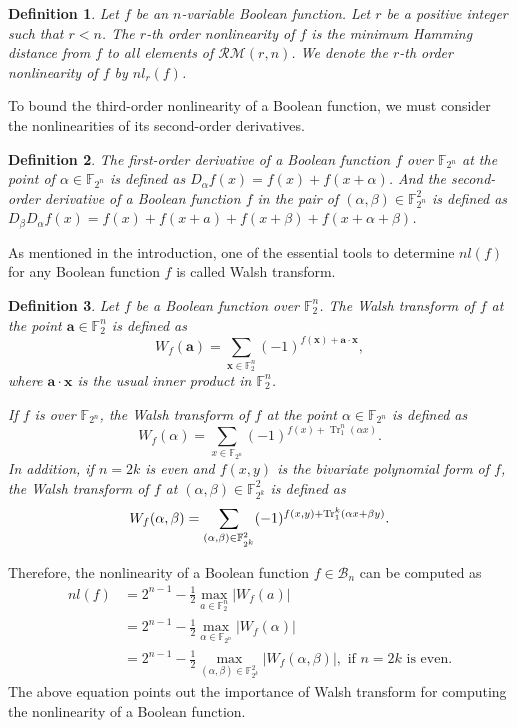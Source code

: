 \documentclass{article}
\newcommand{\F}{\mathbb{F}}
\newcommand{\0}{\textbf{0}}
\newcommand{\1}{\textbf{1}}
\newcommand{\TrN}{\operatorname{Tr}_1^n}
\theoremstyle{plain}
\newtheorem{definition}{Definition}
\begin{document}
    \begin{definition}
        Let $ f $ be an $ n $-variable Boolean function. Let $ r $ be a positive integer such that $ r<n $. 
        The $ r $-th order nonlinearity of $ f $ is the minimum Hamming distance from $ f $ to all elements of $ \mathcal{RM}(r,n) $. 
        We denote the $ r $-th order nonlinearity of $ f $ by $ nl_r(f) $.
    \end{definition}

    To bound the third-order nonlinearity of a Boolean function, we must consider the nonlinearities of its second-order derivatives.

    \begin{definition}
        The first-order derivative of a Boolean function $ f $ over $ \F_{2^n} $ at the point of $ \alpha\in\F_{2^n} $ is defined as $ D_{\alpha}f(x)=f(x)+f(x+\alpha) $. 
        And the second-order derivative of a Boolean function $ f $ in the pair of $ (\alpha,\beta)\in\F_{2^n}^2 $ is defined as $ D_{\beta}D_{\alpha}f(x)=f(x)+f(x+a)+f(x+\beta)+f(x+\alpha+\beta) $.
    \end{definition}

    As mentioned in the introduction, one of the essential tools to determine $ nl(f) $ for any Boolean function $ f $ is called Walsh transform. 
    \begin{definition}
        Let $ f $ be a Boolean function over $ \F_2^n $. The Walsh transform of $ f $ at the point $ \bm{a}\in\F_2^n $ is defined as 
        \[W_f(\bm{a})=\sum_{\bm{x}\in\F_2^n}(-1)^{f(\bm{x})+\bm{a}\cdot\bm{x}},\]
        where $ \bm{a}\cdot \bm{x} $ is the usual inner product in $ \F_2^n $. 

        If $ f $ is over $ \F_{2^n} $, the Walsh transform of $ f $ at the point $ \alpha\in\F_{2^n} $ is defined as 
        \[W_f(\alpha)=\sum_{x\in\F_{2^n}}(-1)^{f(x)+\TrN(\alpha x)}.\]
        In addition, if $ n=2k $ is even and $ f(x,y) $ is the bivariate polynomial form of $ f $, the Walsh transform of $ f $ at $ (\alpha,\beta)\in\F_{2^k}^2 $ is defined as 
        \[W_f(\alpha,\beta)=\sum_{(\alpha,\beta)\in\F_{2^k}^2}(-1)^{f(x,y)+\Tr_1^k(\alpha x+\beta y)}.\]
    \end{definition}
    Therefore, the nonlinearity of a Boolean function $ f\in\mathcal{B}_n $ can be computed as 
    \begin{align*}
        nl(f) &= 2^{n-1} - \frac{1}{2}\max_{a\in\F_2^n}|W_f(a)|\\
              &= 2^{n-1} - \frac{1}{2}\max_{\alpha\in\F_{2^n}}|W_f(\alpha)|\\
              &= 2^{n-1} - \frac{1}{2}\max_{(\alpha,\beta)\in\F_{2^k}^2}|W_f(\alpha,\beta)|,\text{~if~}n=2k\text{~is~even}. 
    \end{align*}
    The above equation points out the importance of Walsh transform for computing the nonlinearity of a Boolean function.
    
\end{document}
